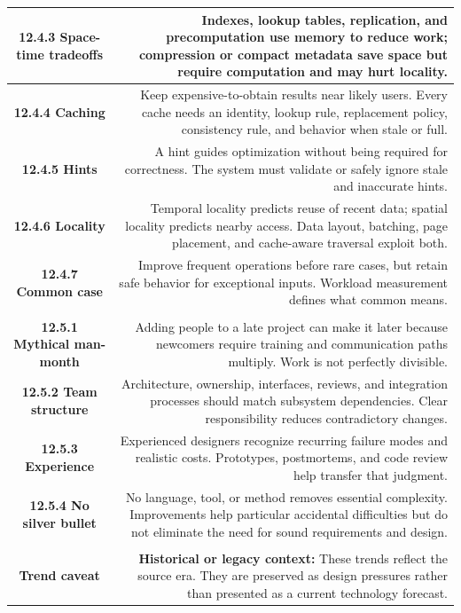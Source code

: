 \documentclass[10pt,letterpaper]{article}
\begin{document}
\begin{longtable}{C N}
\textbf{12.4.3 Space-time tradeoffs} & Indexes, lookup tables, replication, and precomputation use memory to reduce work; compression or compact metadata save space but require computation and may hurt locality.\\\hline
\textbf{12.4.4 Caching} & Keep expensive-to-obtain results near likely users. Every cache needs an identity, lookup rule, replacement policy, consistency rule, and behavior when stale or full.\\\hline
\textbf{12.4.5 Hints} & A hint guides optimization without being required for correctness. The system must validate or safely ignore stale and inaccurate hints.\\\hline
\textbf{12.4.6 Locality} & Temporal locality predicts reuse of recent data; spatial locality predicts nearby access. Data layout, batching, page placement, and cache-aware traversal exploit both.\\\hline
\textbf{12.4.7 Common case} & Improve frequent operations before rare cases, but retain safe behavior for exceptional inputs. Workload measurement defines what common means.\\\hline
{}\\*\hline
\textbf{12.5.1 Mythical man-month} & Adding people to a late project can make it later because newcomers require training and communication paths multiply. Work is not perfectly divisible.\\\hline
\textbf{12.5.2 Team structure} & Architecture, ownership, interfaces, reviews, and integration processes should match subsystem dependencies. Clear responsibility reduces contradictory changes.\\\hline
\textbf{12.5.3 Experience} & Experienced designers recognize recurring failure modes and realistic costs. Prototypes, postmortems, and code review help transfer that judgment.\\\hline
\textbf{12.5.4 No silver bullet} & No language, tool, or method removes essential complexity. Improvements help particular accidental difficulties but do not eliminate the need for sound requirements and design.\\\hline
{}\\*\hline
\textbf{Trend caveat} & \textcolor{legacy}{\textbf{Historical or legacy context:}} These trends reflect the source era. They are preserved as design pressures rather than presented as a current technology forecast.\\\hline

\end{longtable}
\end{document}
